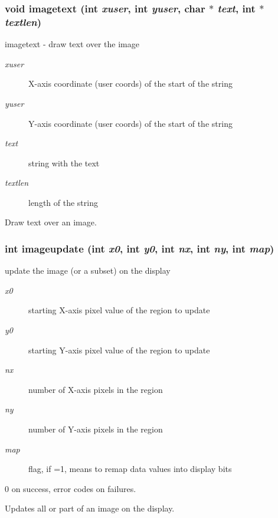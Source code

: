 \subsubsection{\setlength{\rightskip}{0pt plus 5cm}void {\bf imagetext} (int {\em xuser}, int {\em yuser}, char $\ast$ {\em text}, int $\ast$ {\em textlen})}\label{xtv_8h_a69}


imagetext - draw text over the image 

\begin{Desc}
\item[Parameters:]
\begin{description}
\item[{\em xuser}]X-axis coordinate (user coords) of the start of the string \item[{\em yuser}]Y-axis coordinate (user coords) of the start of the string \item[{\em text}]string with the text \item[{\em textlen}]length of the string\end{description}
\end{Desc}
Draw text over an image. 
\subsubsection{\setlength{\rightskip}{0pt plus 5cm}int imageupdate (int {\em x0}, int {\em y0}, int {\em nx}, int {\em ny}, int {\em map})}\label{xtv_8h_a61}


update the image (or a subset) on the display 

\begin{Desc}
\item[Parameters:]
\begin{description}
\item[{\em x0}]starting X-axis pixel value of the region to update \item[{\em y0}]starting Y-axis pixel value of the region to update \item[{\em nx}]number of X-axis pixels in the region \item[{\em ny}]number of Y-axis pixels in the region \item[{\em map}]flag, if =1, means to remap data values into display bits\end{description}
\end{Desc}
\begin{Desc}
\item[Returns:]0 on success, error codes on failures.\end{Desc}
Updates all or part of an image on the display. 
